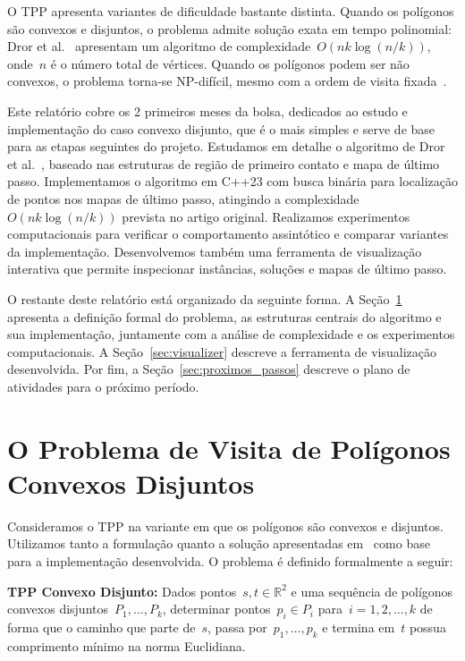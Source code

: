 \documentclass[11pt]{article}
\newenvironment{blockQuote}[1][lightgray]{%
	\begin{mdframed}[
		leftline=true, topline=false, bottomline=false, rightline=false,
		linecolor=gray, linewidth=2pt, backgroundcolor=#1,
		skipabove=\baselineskip, skipbelow=\baselineskip,
		innerleftmargin=10pt, innerrightmargin=10pt,
		innertopmargin=5pt, innerbottommargin=5pt
	]
}{\end{mdframed}}
\begin{document}
O TPP apresenta variantes de dificuldade bastante distinta. Quando os polígonos são convexos e disjuntos, o problema admite solução exata em tempo polinomial: Dror et al.~\cite{tpp-dror-2003} apresentam um algoritmo de complexidade~\(O(nk\log(n/k))\), onde~\(n\) é o número total de vértices. Quando os polígonos podem ser não convexos, o problema torna-se NP-difícil, mesmo com a ordem de visita fixada~\cite{tpp-dror-2003}.

Este relatório cobre os 2 primeiros meses da bolsa, dedicados ao estudo e implementação do caso convexo disjunto, que é o mais simples e serve de base para as etapas seguintes do projeto. Estudamos em detalhe o algoritmo de Dror et al.~\cite{tpp-dror-2003}, baseado nas estruturas de região de primeiro contato e mapa de último passo. Implementamos o algoritmo em C++23 com busca binária para localização de pontos nos mapas de último passo, atingindo a complexidade~\(O(nk\log(n/k))\) prevista no artigo original. Realizamos experimentos computacionais para verificar o comportamento assintótico e comparar variantes da implementação. Desenvolvemos também uma ferramenta de visualização interativa que permite inspecionar instâncias, soluções e mapas de último passo.

O restante deste relatório está organizado da seguinte forma. A Seção~\ref{sec:convex_tpp} apresenta a definição formal do problema, as estruturas centrais do algoritmo e sua implementação, juntamente com a análise de complexidade e os experimentos computacionais. A Seção~\ref{sec:visualizer} descreve a ferramenta de visualização desenvolvida. Por fim, a Seção~\ref{sec:proximos_passos} descreve o plano de atividades para o próximo período.

\section{O Problema de Visita de Polígonos Convexos Disjuntos}
\label{sec:convex_tpp}

Consideramos o TPP na variante em que os polígonos são convexos e disjuntos. Utilizamos tanto a formulação quanto a solução apresentadas em~\cite{tpp-dror-2003} como base para a implementação desenvolvida. O problema é definido formalmente a seguir:

\begin{blockQuote}
{\large \textbf{TPP Convexo Disjunto:}} Dados pontos~\(s, t \in \mathbb{R}^2\) e uma sequência de polígonos convexos disjuntos~\(P_1, \dots, P_k\), determinar pontos~\(p_i \in P_i\) para~\(i = 1, 2, \dots, k\) de forma que o caminho que parte de~\(s\), passa por~\(p_1, \dots, p_k\) e termina em~\(t\) possua comprimento mínimo na norma Euclidiana.
\end{blockQuote}
\end{document}
